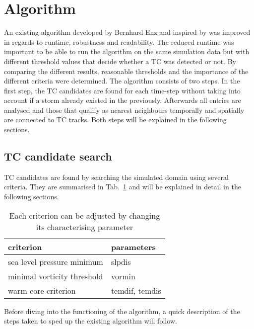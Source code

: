 \section{Algorithm}
An existing algorithm developed by Bernhard Enz and inspired by \cite{orig-tracking} was improved in regards to runtime, robustness and
readability. The reduced runtime was important to be able to run the algorithm on the
same simulation data but with different threshold values that decide whether a
TC was detected or not. By comparing the different results, reasonable thresholds
and the importance of the different criteria were determined.\newline
The algorithm consists of two steps. In the first step, the TC candidates are
found for each time-step without taking into account if a storm already existed
in the previously. Afterwards all entries are analysed and those that qualify as nearest neighbours temporally and spatially are connected to TC tracks. Both steps
will be explained in the following sections.
\subsection{TC candidate search}
TC candidates are found by searching the simulated domain using several
criteria. They are summarised in Tab.~\ref{tab:search-algo-summ} and will be
explained in detail in the following sections. 
\begin{table}[h]
	\centering
	\begin{tabular}{|l|l|}
		\hline
		\textbf{criterion}          & \textbf{parameters} \\ \hline
		sea level pressure minimum  & slpdis              \\
		minimal vorticity threshold & vormin              \\
		warm core criterion         & temdif, temdis      \\ \hline
	\end{tabular}
	\caption{Each criterion can be adjusted by changing its characterising
		parameter}
	\label{tab:search-algo-summ}
\end{table}
Before diving into the functioning of the algorithm, a quick description of the steps taken to sped up the existing algorithm will follow.

